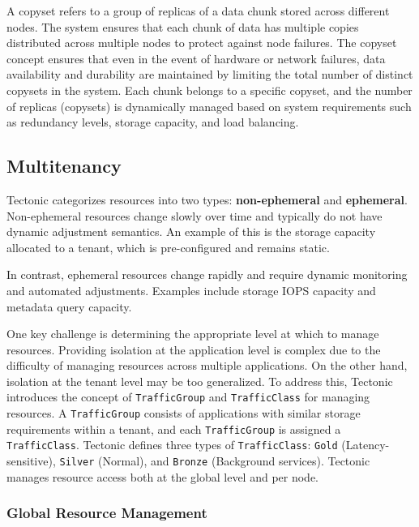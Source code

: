 A copyset refers to a group of replicas of a data chunk stored across different nodes. The system ensures that each chunk of data has multiple copies distributed across multiple nodes to protect against node failures. The copyset concept ensures that even in the event of hardware or network failures, data availability and durability are maintained by limiting the total number of distinct copysets in the system. Each chunk belongs to a specific copyset, and the number of replicas (copysets) is dynamically managed based on system requirements such as redundancy levels, storage capacity, and load balancing.


\subsection{Multitenancy}\label{sec:multitenancy}

Tectonic categorizes resources into two types: \textbf{non-ephemeral} and \textbf{ephemeral}. Non-ephemeral resources change slowly over time and typically do not have dynamic adjustment semantics. An example of this is the storage capacity allocated to a tenant, which is pre-configured and remains static.

In contrast, ephemeral resources change rapidly and require dynamic monitoring and automated adjustments. Examples include storage IOPS capacity and metadata query capacity.

One key challenge is determining the appropriate level at which to manage resources. Providing isolation at the application level is complex due to the difficulty of managing resources across multiple applications. On the other hand, isolation at the tenant level may be too generalized. To address this, Tectonic introduces the concept of \texttt{TrafficGroup} and \texttt{TrafficClass} for managing resources. A \texttt{TrafficGroup} consists of applications with similar storage requirements within a tenant, and each \texttt{TrafficGroup} is assigned a \texttt{TrafficClass}. Tectonic defines three types of \texttt{TrafficClass}: \texttt{Gold} (Latency-sensitive), \texttt{Silver} (Normal), and \texttt{Bronze} (Background services). Tectonic manages resource access both at the global level and per node.

\subsubsection{Global Resource Management}\label{sec:global_resource_management}

